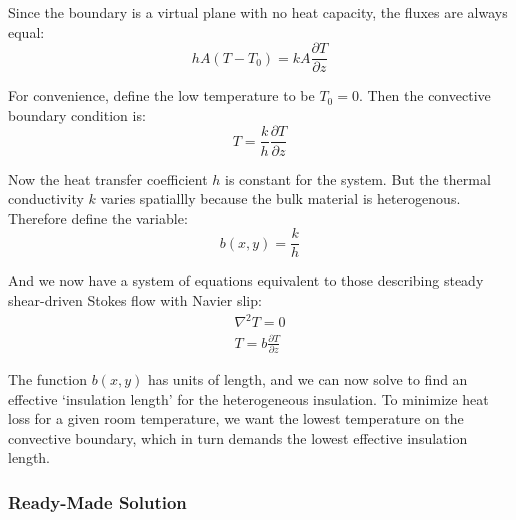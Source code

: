 \documentclass[a4paper]{report}
\newcommand{\beff}{\ensuremath{b_{\mathrm{eff}}}}
\newcommand{\Tr}{\ensuremath{T_{\mathrm{room}}}}
\begin{document}
Since the boundary is a virtual plane with no heat capacity, the fluxes are always equal:
\begin{equation}
h A (T - T_0) = k A \frac{\partial T}{\partial z}
\end{equation}

For convenience, define the low temperature to be $T_0 = 0$.  Then the convective boundary condition is:
\begin{equation}
T = \frac{k}{h} \frac{\partial T}{\partial z}
\end{equation}

Now the heat transfer coefficient $h$ is constant for the system.  But the thermal conductivity $k$ varies spatiallly because the bulk material is heterogenous.  Therefore define the variable:
\begin{equation}
b(x,y) = \frac{k}{h}
\end{equation}

And we now have a system of equations equivalent to those describing steady shear-driven Stokes flow with Navier slip:
\begin{gather}
\nabla^2 T = 0 \\
T = b \frac{\partial T}{\partial z}
\end{gather}

The function $b(x,y)$ has units of length, and we can now solve to find an effective `insulation length' for the heterogeneous insulation.  To minimize heat loss for a given room temperature, we want the lowest temperature on the convective boundary, which in turn demands the lowest effective insulation length.

\begin{center}
\end{center}


\subsubsection*{Ready-Made Solution}
\end{document}
